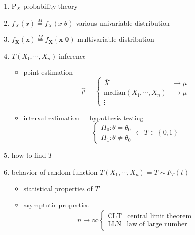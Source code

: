\documentclass[
]{book}
\providecommand{\tightlist}{%
  \setlength{\itemsep}{0pt}\setlength{\parskip}{0pt}}
\theoremstyle{definition}
\theoremstyle{definition}
\theoremstyle{definition}
\theoremstyle{definition}
\theoremstyle{remark}
\begin{document}
\begin{enumerate}
\def\labelenumi{\arabic{enumi}.}
\tightlist
\item
  \(\mathrm{P}_{{\scriptscriptstyle X}}\) probability theory
\item
  \(f_{{\scriptscriptstyle X}}\left(x\right)\overset{M}{=}f_{{\scriptscriptstyle X}}\left(x|\theta\right)\) various univariable distribution
\item
  \(f_{\boldsymbol{{\scriptscriptstyle X}}}\left(\boldsymbol{x}\right)\overset{M}{=}f_{\boldsymbol{{\scriptscriptstyle X}}}\left(\boldsymbol{x}|\boldsymbol{\theta}\right)\) multivariable distribution
\item
  \(T\left(X_{{\scriptscriptstyle 1}},\cdots,X_{{\scriptscriptstyle n}}\right)\) inference

  \begin{itemize}
  \tightlist
  \item
    point estimation
    \[
      \widehat{\mu}=\begin{cases}
      \overline{X} & \rightarrow\mu\\
      \mathrm{median}\left(X_{{\scriptscriptstyle 1}},\cdots,X_{{\scriptscriptstyle n}}\right) & \rightarrow\mu\\
      \vdots
      \end{cases}
    \]
  \item
    interval estimation = hypothesis testing
    \[
      \begin{cases}
      H_{{\scriptscriptstyle 0}}:\theta=\theta_{{\scriptscriptstyle 0}}\\
      H_{{\scriptscriptstyle 1}}:\theta\ne\theta_{{\scriptscriptstyle 0}}
      \end{cases}\leftarrow T\in\left\{ 0,1\right\} 
    \]
  \end{itemize}
\item
  how to find \(T\)
\item
  behavior of random function \(T\left(X_{{\scriptscriptstyle 1}},\cdots,X_{{\scriptscriptstyle n}}\right)=T\sim F_{{\scriptscriptstyle T}}\left(t\right)\)

  \begin{itemize}
  \tightlist
  \item
    statistical properties of \(T\)
  \item
    asymptotic properties
    \[
      n\rightarrow\infty\begin{cases}
      \text{CLT}=\text{central limit theorem}\\
      \text{LLN}=\text{law of large number}
      \end{cases}
    \]
  \end{itemize}
\end{enumerate}
\end{document}
